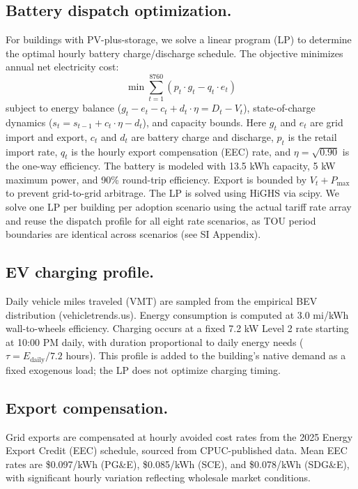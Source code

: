 \documentclass[9pt,twocolumn,twoside]{pnas-new}
\begin{document}
\subsection*{Battery dispatch optimization.}
For buildings with PV-plus-storage, we solve a linear program (LP) to determine the optimal hourly battery charge/discharge schedule. The objective minimizes annual net electricity cost:
\begin{equation}
    \min \sum_{t=1}^{8760} \left( p_t \cdot g_t - q_t \cdot e_t \right)
\end{equation}
subject to energy balance ($g_t - e_t - c_t + d_t \cdot \eta = D_t - V_t$), state-of-charge dynamics ($s_t = s_{t-1} + c_t \cdot \eta - d_t$), and capacity bounds. Here $g_t$ and $e_t$ are grid import and export, $c_t$ and $d_t$ are battery charge and discharge, $p_t$ is the retail import rate, $q_t$ is the hourly export compensation (EEC) rate, and $\eta = \sqrt{0.90}$ is the one-way efficiency. The battery is modeled with 13.5 kWh capacity, 5 kW maximum power, and 90\% round-trip efficiency. Export is bounded by $V_t + P_{\max}$ to prevent grid-to-grid arbitrage. The LP is solved using HiGHS via scipy. We solve one LP per building per adoption scenario using the actual tariff rate array and reuse the dispatch profile for all eight rate scenarios, as TOU period boundaries are identical across scenarios (see SI Appendix).

\subsection*{EV charging profile.}
Daily vehicle miles traveled (VMT) are sampled from the empirical BEV distribution (vehicletrends.us). Energy consumption is computed at 3.0 mi/kWh wall-to-wheels efficiency. Charging occurs at a fixed 7.2 kW Level 2 rate starting at 10:00 PM daily, with duration proportional to daily energy needs ($\tau = E_{\text{daily}} / 7.2$ hours). This profile is added to the building's native demand as a fixed exogenous load; the LP does not optimize charging timing.

\subsection*{Export compensation.}
Grid exports are compensated at hourly avoided cost rates from the 2025 Energy Export Credit (EEC) schedule, sourced from CPUC-published data. Mean EEC rates are \$0.097/kWh (PG\&E), \$0.085/kWh (SCE), and \$0.078/kWh (SDG\&E), with significant hourly variation reflecting wholesale market conditions.


\showmatmethods{}

\acknow{[PLACEHOLDER]}

\showacknow{}


\end{document}
